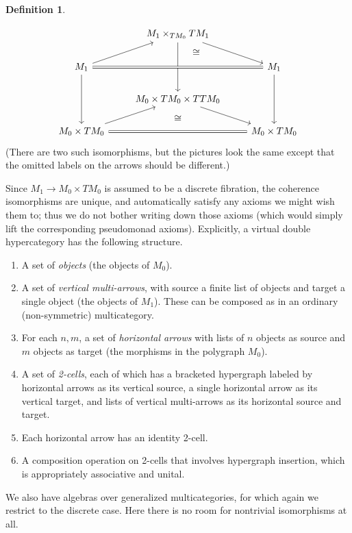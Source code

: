 \documentclass{article}
\theoremstyle{definition}
\newtheorem{defn}[thm]{Definition}
\theoremstyle{remark}
\begin{document}
\begin{defn}
\begin{enumerate}
    \[
    \begin{tikzcd}
      & M_1 \times_{TM_0} TM_1 \ar[dr] \ar[dddr,phantom,"\cong" very near start] \ar[dd] \\
      M_1 \ar[rr,equals] \ar[ur]\ar[dd] &~ & M_1\ar[dd]\\
      & M_0\times TM_0 \times TTM_0 \ar[dr] \ar[d,phantom,"\cong"] \\
      M_0\times TM_0 \ar[rr,equals]\ar[ur] &~& M_0\times TM_0
    \end{tikzcd}
    \]
    (There are two such isomorphisms, but the pictures look the same except that the omitted labels on the arrows should be different.)
  \end{enumerate}
\end{defn}

Since $M_1 \to M_0\times TM_0$ is assumed to be a discrete fibration, the coherence isomorphisms are unique, and automatically satisfy any axioms we might wish them to; thus we do not bother writing down those axioms (which would simply lift the corresponding pseudomonad axioms).
Explicitly, a virtual double hypercategory has the following structure.

\begin{enumerate}
\item A set of \emph{objects} (the objects of $M_0$).
\item A set of \emph{vertical multi-arrows}, with source a finite list of objects and target a single object (the objects of $M_1$).
  These can be composed as in an ordinary (non-symmetric) multicategory.
\item For each $n,m$, a set of \emph{horizontal arrows} with lists of $n$ objects as source and $m$ objects as target (the morphisms in the polygraph $M_0$).
\item A set of \emph{2-cells}, each of which has a bracketed hypergraph labeled by horizontal arrows as its vertical source, a single horizontal arrow as its vertical target, and lists of vertical multi-arrows as its horizontal source and target.
\item Each horizontal arrow has an identity 2-cell.
\item A composition operation on 2-cells that involves hypergraph insertion, which is appropriately associative and unital.
\end{enumerate}

We also have algebras over generalized multicategories, for which again we restrict to the discrete case.
Here there is no room for nontrivial isomorphisms at all.
\end{document}

